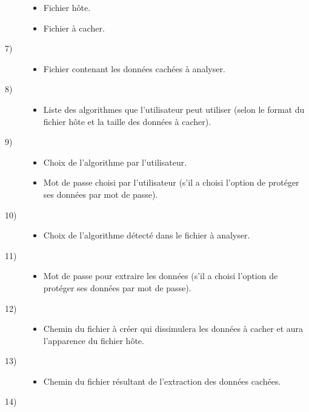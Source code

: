 \documentclass[11pt]{article}
\begin{document}
\begin{description}
\begin{itemize}
\item Fichier hôte.
\item Fichier à cacher.
\end{itemize}
\item[7)]
\begin{itemize}
\item Fichier contenant les données cachées à analyser.
\end{itemize}
\item[8)]
\begin{itemize}
\item Liste des algorithmes que l'utilisateur peut utiliser (selon le format du
    fichier hôte et la taille des données à cacher).
\end{itemize}
\item[9)]
\begin{itemize}
\item Choix de l'algorithme par l'utilisateur.
\item Mot de passe choisi par l'utilisateur (s'il a choisi l'option de protéger
    ses données par mot de passe).
\end{itemize}
\item[10)]
\begin{itemize}
\item Choix de l'algorithme détecté dans le fichier à analyser.
\end{itemize}
\item[11)]
\begin{itemize}
\item Mot de passe pour extraire les données (s'il a choisi l'option de
    protéger ses données par mot de passe).
\end{itemize}
\item[12)]
\begin{itemize}
\item Chemin du fichier à créer qui dissimulera les données à cacher et aura
    l'apparence du fichier hôte.
\end{itemize}
\item[13)]
\begin{itemize}
\item Chemin du fichier résultant de l'extraction des données cachées.
\end{itemize}
\item[14)]

\end{description}
\end{document}
